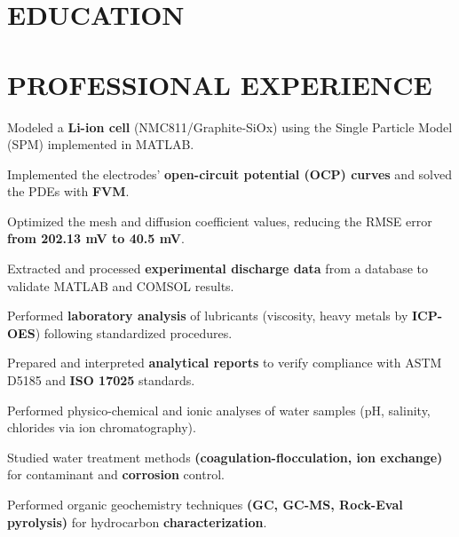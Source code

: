 \documentclass[10pt]{article}
\begin{document}

\section{EDUCATION}

\section{PROFESSIONAL EXPERIENCE}
\begin{bul}
\item Modeled a \textbf{Li-ion cell} (NMC811/Graphite-SiOx) using the Single Particle Model (SPM) implemented in MATLAB.
\item Implemented the electrodes' \textbf{open-circuit potential (OCP) curves} and solved the PDEs with \textbf{FVM}.
\item Optimized the mesh and diffusion coefficient values, reducing the RMSE error \textbf{from 202.13 mV to 40.5 mV}.
\item Extracted and processed \textbf{experimental discharge data} from a database to validate MATLAB and COMSOL results.
\end{bul}
\begin{bul}
\item Performed \textbf{laboratory analysis} of lubricants (viscosity, heavy metals by \textbf{ICP-OES}) following standardized procedures.
\item Prepared and interpreted \textbf{analytical reports} to verify compliance with ASTM D5185 and \textbf{ISO 17025} standards.
\end{bul}
\begin{bul}
\item Performed physico-chemical and ionic analyses of water samples (pH, salinity, chlorides via ion chromatography).
\item Studied water treatment methods \textbf{(coagulation-flocculation, ion exchange)} for contaminant and \textbf{corrosion} control.
\item Performed organic geochemistry techniques \textbf{(GC, GC-MS, Rock-Eval pyrolysis)} for hydrocarbon \textbf{characterization}.
\end{bul}
\end{document}

